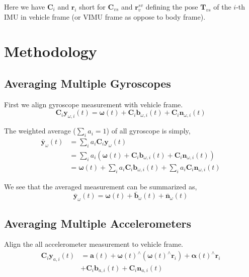 \documentclass[conference]{IEEEtran}
\begin{document}
Here we have $\textbf{C}_i$ and $\textbf{r}_i$ short for $\textbf{C}_{vs}$ and $\textbf{r}_v^{sv}$ defining the pose $\textbf{T}_{vs}$ of the $i$-th IMU in vehicle frame (or VIMU frame as oppose to body frame).

\section{Methodology}\label{methodology}

\subsection{Averaging Multiple Gyroscopes}

First we align gyroscope measurement with vehicle frame.
\begin{equation}
    \textbf{C}_{i} \textbf{y}_{\omega,i}(t) = \bm{\omega}(t) + \textbf{C}_{i} \textbf{b}_{\omega, i}(t) + \textbf{C}_{i} \textbf{n}_{\omega,i}(t)
\end{equation}

The weighted average ($\sum_i{a_i} = 1$) of all gyroscope is simply,
\begin{equation}
\begin{split}
    \bar{\textbf{y}}_\omega(t) &= \sum_i{a_i \textbf{C}_{i} \textbf{y}_\omega(t)} \\
    &= \sum_i{a_i \left( \bm{\omega}(t) + \textbf{C}_{i} \textbf{b}_{\omega,i}(t) + \textbf{C}_{i} \textbf{n}_{\omega,i}(t) \right)} \\
    &= \bm{\omega}(t) + \sum_i{a_i \textbf{C}_{i} \textbf{b}_{\omega,i}(t)} + \sum_i{a_i \textbf{C}_{i} \textbf{n}_{\omega,i}(t)}
\end{split}
\end{equation}

We see that the averaged measurement can be summarized as,
\begin{equation}
    \bar{\textbf{y}}_\omega(t) = \bm{\omega}(t) + \bar{\textbf{b}}_\omega(t) + \bar{\textbf{n}}_\omega(t)
\end{equation}

\subsection{Averaging Multiple Accelerometers}

Align the all accelerometer measurement to vehicle frame.
\begin{equation}\label{eqn_accel}
\begin{split}
    \textbf{C}_{i} \textbf{y}_{a,i}(t) &= \textbf{a}(t) + \bm{\omega}(t)^\wedge (\bm{\omega}(t)^\wedge \textbf{r}_i) + \bm{\alpha}(t)^\wedge \textbf{r}_i \\
    &+ \textbf{C}_{i} \textbf{b}_{a,i}(t) + \textbf{C}_{i} \textbf{n}_{a,i}(t)
\end{split}
\end{equation}
\end{document}
